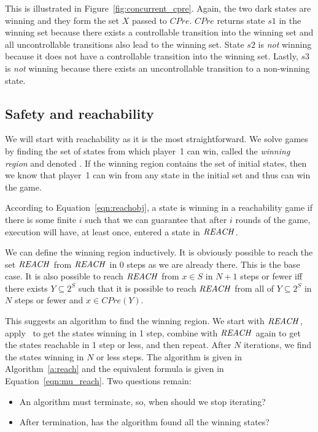 This is illustrated in Figure~\ref{fig:concurrent_cpre}. Again, the two dark states are winning and they form the set $X$ passed to $CPre$. $CPre$ returns state $s1$ in the winning set because there exists a controllable transition into the winning set and all uncontrollable transitions also lead to the winning set. State $s2$ is \emph{not} winning because it does not have a controllable transition into the winning set. Lastly, $s3$ is \emph{not} winning because there exists an uncontrollable transition to a non-winning state.

\subsection{Safety and reachability}

We will start with reachability as it is the most straightforward. We solve games by finding the set of states from which player~1 can win, called the \emph{winning region} and denoted \win. If the winning region contains the set of initial states, then we know that player~1 can win from any state in the initial set and thus can win the game.

According to Equation~\ref{eqn:reachobj}, a state is winning in a reachability game if there is some finite $i$ such that we can guarantee that after $i$ rounds of the game, execution will have, at least once, entered a state in $\mathit{REACH}$. 

We can define the winning region inductively. It is obviously possible to reach the set $\mathit{REACH}$ from $\mathit{REACH}$ in 0 steps as we are already there. This is the base case. It is also possible to reach $\mathit{REACH}$ from $x \in S$ in $N + 1$ steps or fewer iff there exists $Y\subseteq 2^S$ such that it is possible to reach $\mathit{REACH}$ from all of $Y \subseteq 2^S$ in $N$ steps or fewer and $x \in CPre(Y)$.

This suggests an algorithm to find the winning region. We start with $\mathit{REACH}$, apply \cpre\ to get the states winning in 1 step, combine with $\mathit{REACH}$ again to get the states reachable in 1 step or less, and then repeat. After $N$ iterations, we find the states winning in $N$ or less steps. The algorithm is given in Algorithm~\ref{a:reach} and the equivalent \mucalc formula is given in Equation~\ref{eqn:mu_reach}. Two questions remain: 

\begin{itemize}
    \item An algorithm must terminate, so, when should we stop iterating?
    \item After termination, has the algorithm found all the winning states?
\end{itemize}

